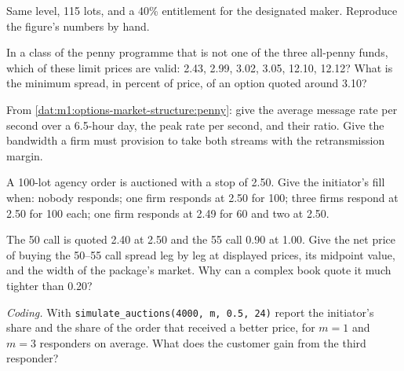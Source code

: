 \begin{exercise}[$\star$]\label{exo:m1:options-market-structure:2}
Same level, 115 lots,  and a 40\% entitlement for the
designated maker. Reproduce the figure's numbers by hand.
\end{exercise}

\begin{exercise}[$\star$]\label{exo:m1:options-market-structure:3}
In a class of the penny programme that is not one of the three all-penny
funds, which of these limit prices are valid: 2.43, 2.99, 3.02, 3.05, 12.10,
12.12? What is the minimum spread, in percent of price, of an option quoted
around 3.10?
\end{exercise}

\begin{exercise}[$\star\star$]\label{exo:m1:options-market-structure:4}
From \cref{dat:m1:options-market-structure:penny}: give the average message
rate per second over a 6.5-hour day, the peak rate per second, and their
ratio. Give the bandwidth a firm must provision to take both streams with the
retransmission margin.
\end{exercise}

\begin{exercise}[$\star\star$]\label{exo:m1:options-market-structure:5}
A 100-lot agency order is auctioned with a stop of 2.50. Give the
initiator's fill when: nobody responds; one firm responds at 2.50 for 100;
three firms respond at 2.50 for 100 each; one firm responds at 2.49 for 60 and
two at 2.50.
\end{exercise}

\begin{exercise}[$\star\star$]\label{exo:m1:options-market-structure:6}
The 50 call is quoted 2.40 at 2.50 and the 55 call 0.90 at 1.00. Give the net
price of buying the 50--55 call spread leg by leg at displayed prices, its
midpoint value, and the width of the package's market. Why can a complex
book quote it much tighter than 0.20?
\end{exercise}

\begin{exercise}[$\star\star\star$]\label{exo:m1:options-market-structure:7}
\emph{Coding.} With \texttt{simulate\_auctions(4000, m, 0.5, 24)} report the
initiator's share and the share of the order that received a better price,
for $m = 1$ and $m = 3$ responders on average. What does the customer gain
from the third responder?
\end{exercise}

